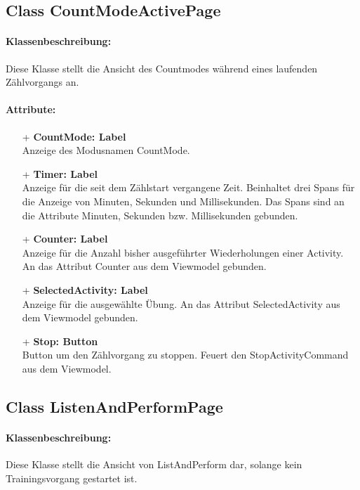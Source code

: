 \documentclass[a4paper,12pt]{article}
\begin{document}
\subsection{Class CountModeActivePage}
\paragraph{Klassenbeschreibung:}
Diese Klasse stellt die Ansicht des Countmodes während eines laufenden Zählvorgangs an.
\paragraph{Attribute:}
	\begin{itemize}
	\item[+] \textbf{CountMode: Label} \\ Anzeige des Modusnamen CountMode.
	\item[+] \textbf{Timer: Label} \\ Anzeige für die seit dem Zählstart vergangene Zeit. Beinhaltet drei Spans für die Anzeige von Minuten, Sekunden und Millisekunden. Das Spans sind an die Attribute Minuten, Sekunden bzw. Millisekunden gebunden.
	\item[+] \textbf{Counter: Label} \\ Anzeige für die Anzahl bisher ausgeführter Wiederholungen einer Activity. An das Attribut Counter aus dem Viewmodel gebunden.
	\item[+] \textbf{SelectedActivity: Label} \\ Anzeige für die ausgewählte Übung. An das Attribut SelectedActivity aus dem Viewmodel gebunden.
	\item[+] \textbf{Stop: Button} \\ Button um den Zählvorgang zu stoppen. Feuert den StopActivityCommand aus dem Viewmodel.
	\end{itemize}

\subsection{Class ListenAndPerformPage}
\paragraph{Klassenbeschreibung:}
Diese Klasse stellt die Ansicht von ListAndPerform dar, solange kein Trainingsvorgang gestartet ist.
\end{document}
